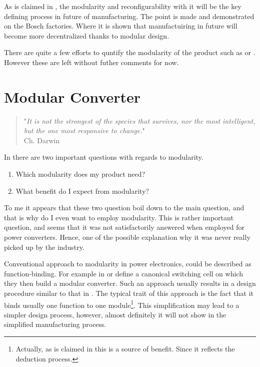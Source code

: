 \documentclass[]{scrartcl}
\begin{document}
As is claimed in \cite{Sch??fer2007}, the modularity and reconfigurability with it will be the key defining process in future of manufacturing. The point is made and demonstrated on the Bosch factories.  Where it is shown that manufactuiring in future will become more decentralized thanks to modular design.

There are quite a few efforts to quntify the modularity of the product such as \cite{Huang1998} or \cite{Ji2012}. However these are left without futher comments for now. 

\newpage
\section{Modular Converter}
\begin{quote}
	"\emph{It is not the strongest of the species that survives, nor the most intelligent, but the one most responsive to change.}" \\
	Ch. Darwin \\
\end{quote}

In \cite{Bradshaw2015} there are two important questions with regards to modularity. 
\begin{enumerate}
	\item Which modularity does my product need?
	\item What benefit do I expect from modularity?
\end{enumerate}

To me it appears that these two question boil down to the main question, and that is why do I even want to employ modularity. This is rather important question, and seems that it was not satisfactorily answered when employed for power converters. Hence, one of the possible explanation why it was never really picked up by the industry. 

Conventional approach to modularity in power electronics, could be described as function-binding. For example in \cite{Khan2007} or \cite{Kenzelmann2012a} define a canonical switching cell on which they then build a modular converter. Such an approach usually results in a design procedure similar to that in \cite{Ortjohann2009}. The typical trait of this approach is the fact that it binds usually one function to one module\footnote{Actually, as is claimed in \cite{Li2006} this is a source of benefit. Since it reflects the deduction process.}. This simplification may lead to a simpler design process, however, almost definitely it will not show in the simplified manufacturing process. 
\end{document}
